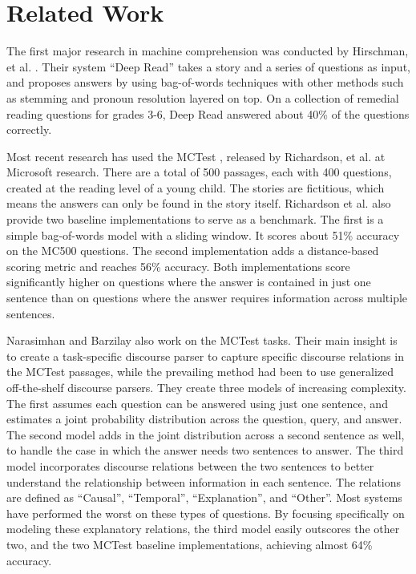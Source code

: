 \documentclass[pageno]{final_paper}
\begin{document}
\section{Related Work}
\label{Related Work}

The first major research in machine comprehension was conducted by Hirschman, et
al. \cite{Hirschman1999}. Their system ``Deep Read'' takes a story and a series
of questions as input, and proposes answers by using bag-of-words techniques
with other methods such as stemming and pronoun resolution layered on top. On a
collection of remedial reading questions for grades 3-6, Deep Read answered
about 40\% of the questions correctly.

Most recent research has used the MCTest \cite{Richardson2013}, released by
Richardson, et al. at Microsoft research. There are a total of 500 passages,
each with 400 questions, created at the reading level of a young child. The
stories are fictitious, which means the answers can only be found in the story
itself. Richardson et al. also provide two baseline implementations to serve as
a benchmark. The first is a simple bag-of-words model with a sliding window. It
scores about 51\% accuracy on the MC500 questions. The second implementation
adds a distance-based scoring metric and reaches 56\% accuracy. Both
implementations score significantly higher on questions where the answer is
contained in just one sentence than on questions where the answer requires
information across multiple sentences.

Narasimhan and Barzilay \cite{Narasimhan2015} also work on the MCTest tasks.
Their main insight is to create a task-specific discourse parser to capture
specific discourse relations in the MCTest passages, while the prevailing method
had been to use generalized off-the-shelf discourse parsers. They create three
models of increasing complexity. The first assumes each question can be answered
using just one sentence, and estimates a joint probability distribution across
the question, query, and answer. The second model adds in the joint distribution
across a second sentence as well, to handle the case in which the answer needs
two sentences to answer. The third model incorporates discourse relations
between the two sentences to better understand the relationship between
information in each sentence. The relations are defined as ``Causal'',
``Temporal'', ``Explanation'', and ``Other''. Most systems have performed the
worst on these types of questions. By focusing specifically on modeling these
explanatory relations, the third model easily outscores the other two, and the
two MCTest baseline implementations, achieving almost 64\% accuracy.
\end{document}
